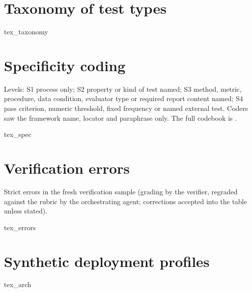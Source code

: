 \documentclass[conference]{IEEEtran}
\begin{document}



\clearpage
\appendix
\section{Taxonomy of test types}\label{app:taxonomy}
{{tex_taxonomy}}

\section{Specificity coding}\label{app:spec}
Levels: S1 process only; S2 property or kind of test named; S3 method, metric, procedure, data condition, evaluator type or required report content named; S4 pass criterion, numeric threshold, fixed frequency or named external test. Coders saw the framework name, locator and paraphrase only. The full codebook is .

\begin{table}[h]\centering\small
{{tex_spec}}
\caption{Specificity levels (counts) by binding status for the two blind coders.}
\end{table}

\section{Verification errors}\label{app:errors}
Strict errors in the fresh verification sample (grading by the verifier, regraded against the rubric by the orchestrating agent; corrections accepted into the table unless stated).

{{tex_errors}}

\section{Synthetic deployment profiles}\label{app:arch}
\begin{table}[h]\centering\small
{{tex_arch}}
\caption{Items applying, not applying and unknown out of {{ar_items}} when all eight questions are answered; YES is the number of cited rows for which the tool reports that the source binds the organisation.}
\end{table}
\end{document}
